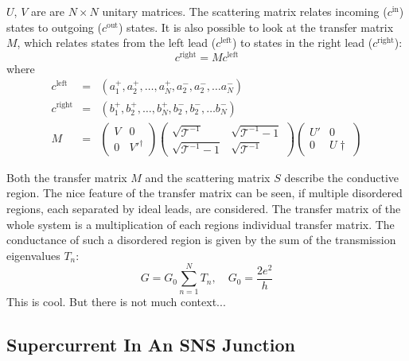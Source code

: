 $U$, $V$ are are $N\times N $ unitary matrices.
The scattering matrix relates incoming ($c^\text{in}$) states to outgoing ($c^\text{out}$) states. It is also possible to look at the transfer matrix $M$, which relates states from the left lead ($c^\text{left}$) to states in the right lead ($c^\text{right}$):
\begin{equation}
c^\text{right} = M c^\text{left}
\end{equation}
where 
\begin{eqnarray}
c^\text{left} &=& \left( a_1^+, a_2^+, \dots, a_N^+, a_2^-, a_2^-, \dots a_N^-\right) \\
c^\text{right} &=& \left( b_1^+, b_2^+, \dots, b_N^+, b_2^-, b_2^-, \dots b_N^-\right) \\
M &=& \begin{pmatrix} V & 0 \\ 0 & V'^\dagger \end{pmatrix} \begin{pmatrix} \sqrt{\mathcal{T}^{-1}} & \sqrt{\mathcal{T}^{-1} -1} \\ \sqrt{\mathcal{T}^{-1} -1} & \sqrt{\mathcal{T}^{-1}}\end{pmatrix} \begin{pmatrix} U' & 0 \\ 0 & U\dagger \end{pmatrix}
\end{eqnarray}

Both the transfer matrix $M$ and the scattering matrix $S$ describe the conductive region. The nice feature of the transfer matrix can be seen, if multiple disordered regions, each separated by ideal leads, are considered. The transfer matrix of the whole system is a multiplication of each regions individual transfer matrix.
The conductance of such a disordered region is given by the sum of the transmission eigenvalues $T_n$:
\begin{equation}
G = G_0 \sum_{n=1}^N T_n, \quad G_0 = \frac{2e^2}{h}
\end{equation}
This is cool. But there is not much context...

\subsection{Supercurrent In An SNS Junction}\label{sec:scattering-supercurrent}


